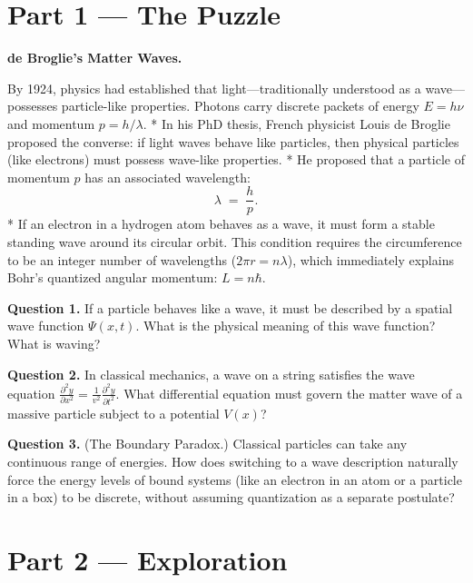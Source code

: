 \documentclass[12pt, a4paper, twoside]{book}
\begin{document}
\section{Part 1 --- The Puzzle}

\begin{puzzlebox}
\textbf{de Broglie's Matter Waves.}

By 1924, physics had established that light—traditionally understood as a wave—possesses particle-like properties. Photons carry discrete packets of energy $E = h\nu$ and momentum $p = h/\lambda$.
* In his PhD thesis, French physicist Louis de Broglie proposed the converse: if light waves behave like particles, then physical particles (like electrons) must possess wave-like properties.
* He proposed that a particle of momentum $p$ has an associated wavelength:
  \[
    \lambda \;=\; \frac{h}{p}.
  \]
* If an electron in a hydrogen atom behaves as a wave, it must form a stable standing wave around its circular orbit. This condition requires the circumference to be an integer number of wavelengths ($2\pi r = n\lambda$), which immediately explains Bohr's quantized angular momentum: $L = n\hbar$.

\medskip
\textbf{Question 1.} If a particle behaves like a wave, it must be described by a spatial wave function $\Psi(x, t)$. What is the physical meaning of this wave function? What is waving?

\textbf{Question 2.} In classical mechanics, a wave on a string satisfies the wave equation $\frac{\partial^2 y}{\partial x^2} = \frac{1}{v^2}\frac{\partial^2 y}{\partial t^2}$. What differential equation must govern the matter wave of a massive particle subject to a potential $V(x)$?

\textbf{Question 3.} (The Boundary Paradox.) Classical particles can take any continuous range of energies. How does switching to a wave description naturally force the energy levels of bound systems (like an electron in an atom or a particle in a box) to be discrete, without assuming quantization as a separate postulate?
\end{puzzlebox}

\newpage

\section{Part 2 --- Exploration}
\end{document}
